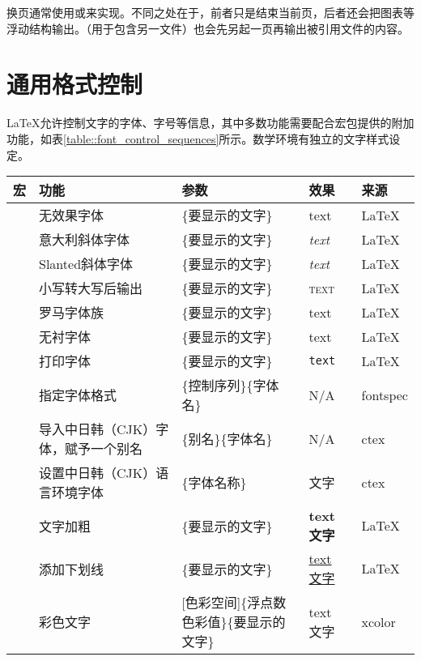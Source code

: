 换页通常使用或来实现。不同之处在于，前者只是结束当前页，后者还会把图表等浮动结构输出。（用于包含另一文件）也会先另起一页再输出被引用文件的内容。

\section{通用格式控制}

\LaTeX 允许控制文字的字体、字号等信息，其中多数功能需要配合宏包提供的附加功能，如表\ref*{table::font_control_sequences}所示。数学环境有独立的文字样式设定。

\begin{center}
	\begin{longtable}{C{2.5cm}C{2.5cm}C{4cm}C{2cm}C{1.5cm}}
		\hline
		宏 & 功能 & 参数 & 效果 & 来源 \\
		\hline
		 & 无效果字体 & \{要显示的文字\} & \textup{text} & \LaTeX \\
		 & 意大利斜体字体 & \{要显示的文字\} & \textit{text} & \LaTeX \\
		 & Slanted斜体字体 & \{要显示的文字\} & \textsl{text} & \LaTeX \\
		 & 小写转大写后输出 & \{要显示的文字\} & \textsc{text} & \LaTeX \\
		 & 罗马字体族 & \{要显示的文字\} & \textrm{text} & \LaTeX \\
		 & 无衬字体 & \{要显示的文字\} & \textsf{text} & \LaTeX \\
		 & 打印字体 & \{要显示的文字\} & \texttt{text} & \LaTeX \\
		 & 指定字体格式 & \{控制序列\}\{字体名\} &  \fontcn N/A & fontspec \\
		 & 导入中日韩（CJK）字体，赋予一个别名 & \{别名\}\{字体名\} &  N/A & ctex \\
		 & 设置中日韩（CJK）语言环境字体 & \{字体名称\} &  文字 & ctex \\
		 & 文字加粗 & \{要显示的文字\} & \textbf{text 文字} & \LaTeX \\
		 & 添加下划线 & \{要显示的文字\} & \underline{text 文字} & \LaTeX \\
		 & 彩色文字 & [色彩空间]\{浮点数色彩值\}\{要显示的文字\} & \textcolor[rgb]{1, 0, 0}{text 文字} & xcolor \\

\end{longtable}
\end{center}
